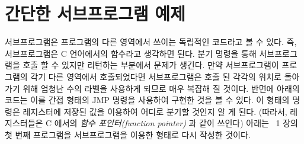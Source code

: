 
\section{간단한 서브프로그램 예제}

서브프로그램은 프로그램의 다른 영역에서 쓰이는 독립적인 코드라고 볼 수 있다. 즉,
서브프로그램은 C 언어에서의 함수라고 생각하면 된다. 분기 명령을 통해 서브프로그램을
호출 할 수 있지만 리턴하는 부분에서 문제가 생긴다. 만약 서브프로그램이 프로그램의 각기
다른 영역에서 호출되었다면 서브프로그램은 호출 된 각각의 위치로 돌아가기 위해
엄청난 수의 라벨을 사용하게 되므로 매우 복잡해 질 것이다. 반면에 아래의 코드는 이를 간접 형태의 {\code JMP} 
명령을 사용하여 구현한 것을 볼 수 있다. 
이 형태의 명령은 레지스터에 저장된 값을 이용하여 어디로 분기할 것인지 알 게 된다.
(따라서, 레지스터들은 C 에서의 \emph{함수 포인터(function pointer)} 과 같이 쓰인다)
아래는 ~1 장의 첫 번째 프로그램을 서브프로그램을 이용한 형태로 다시 작성한 것이다. 

